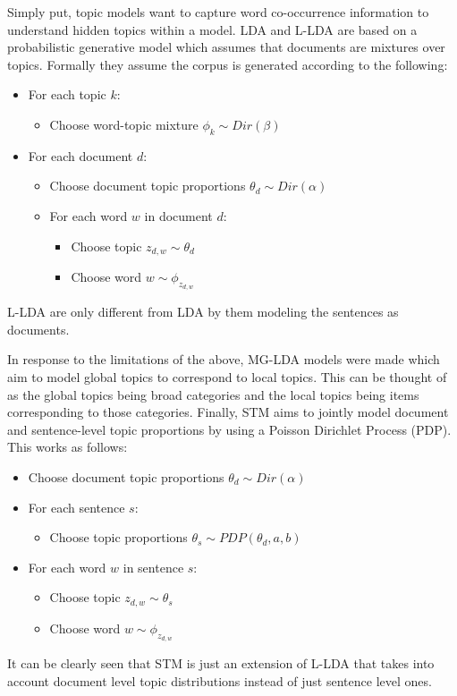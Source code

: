 \documentclass[conference]{IEEEtran}
\begin{document}
Simply put, topic models want to capture word co-occurrence information to understand hidden topics within a model. LDA and L-LDA are based on a probabilistic generative model which assumes that documents are mixtures over topics. Formally they assume the corpus is generated according to the following:
\begin{itemize}
\item For each topic $k$:
  \begin{itemize}
  \item Choose word-topic mixture $\phi_k \sim Dir(\beta)$
  \end{itemize}

\item For each document $d$:
  \begin{itemize}
  \item Choose document topic proportions $\theta_d \sim Dir(\alpha)$
  
  \item For each word $w$ in document $d$:
    \begin{itemize}
    \item Choose topic $z_{d,w} \sim \theta_d$
    \item Choose word $w \sim \phi_{z_{d,w}}$
    \end{itemize}
  \end{itemize}
\end{itemize}
L-LDA are only different from LDA by them modeling the sentences as documents.

In response to the limitations of the above, MG-LDA models were made which aim to model global topics to correspond to local topics. This can be thought of as the global topics being broad categories and the local topics being items corresponding to those categories. Finally, STM aims to jointly model document and sentence-level topic proportions by using a Poisson Dirichlet Process (PDP). This works as follows:
\begin{itemize}
\item Choose document topic proportions $\theta_d \sim Dir(\alpha)$

\item For each sentence $s$:
  \begin{itemize}
  \item Choose topic proportions $\theta_s \sim PDP(\theta_d, a, b)$
  \end{itemize}

\item For each word $w$ in sentence $s$:
  \begin{itemize}
    \item Choose topic $z_{d,w} \sim \theta_s$
    \item Choose word $w \sim \phi_{z_{d,w}}$
  \end{itemize}
\end{itemize}
It can be clearly seen that STM is just an extension of L-LDA that takes into account document level topic distributions instead of just sentence level ones.
\end{document}

